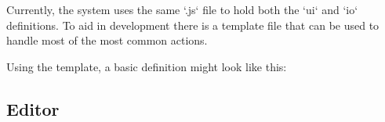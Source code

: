 \documentclass{article}
\def\oscfontsize{\footnotesize}
\begin{document}
Currently, the system uses the same `.js` file to hold both the `ui` and `io` definitions. To aid in development there is a template file that can be used to handle most of the most common actions.

Using the template, a basic definition might look like this:

%
%
%
%
%
%
%            
%
%
%
%        
%    
%
%
%
%
%
%
%
%
%    
%
%




\subsection{Editor}\label{subsec:editor}
\end{document}
